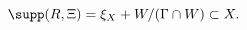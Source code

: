 \begin{equation}
\label{eq:suppRXi}
  \supp(R, \Xi) = \xi_X + W/(\Gamma \cap W) \subset X.
\end{equation}

